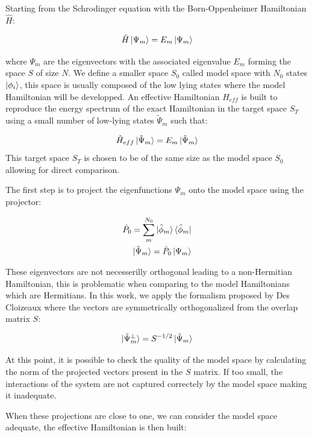 \documentclass[12pt]{report}
\numberwithin{equation}{section}
\begin{document}
Starting from the Schrodinger equation with the Born-Oppenheimer Hamiltonian $\hat{H}$:

\begin{equation}
    \hat{H}\ket{\Psi_m}=E_m\ket{\Psi_m}
\end{equation}

where $\Psi_m$ are the eigenvectors with the associated eigenvalue $E_m$ forming the space $S$ of size $N$. 
We define a smaller space $S_0$ called model space with $N_0$ states $\ket{\phi_i}$, this space is usually composed of the low lying states where the model Hamiltonian will be developped.
An effective Hamiltonian $H_{eff}$  is built to reproduce the energy spectrum of the exact Hamiltonian in the target space $S_T$ using a small number of low-lying states $\tilde{\Psi}_m$ such that:

\begin{equation}
    \hat{H}_{eff}\ket{\tilde{\Psi}_m}=E_m \ket{\tilde{\Psi}_m}
\end{equation}
This target space $S_T$ is chosen to be of the same size as the model space $S_0$ allowing for direct comparison.

The first step is to project the eigenfunctions $\Psi_m$ onto the model space using the projector:

\begin{align}
    \hat{P}_0=\sum_{m}^{N_0} \ket{\tilde{\phi}_m} \bra{\tilde{\phi}_m}\\
    \ket{\tilde{\Psi}_m}=\hat{P}_0 \ket{\Psi_m}
\end{align}

These eigenvectors are not necesserilly orthogonal leading to a non-Hermitian Hamiltonian, this is problematic when comparing to the model Hamiltonians which are Hermitians.
In this work, we apply the formalism proposed by Des Cloizeaux where the vectors are symmetrically orthogonalized from the overlap matrix $S$:

\begin{equation}
    \ket{\tilde{\Psi}_m^\bot}=S^{-1/2} \ket{\tilde{\Psi}_m}
\end{equation}

At this point, it is possible to check the quality of the model space by calculating the norm of the projected vectors present in the $S$ matrix.
If too small, the interactions of the system are not captured correctely by the model space making it inadequate. 
\par When these projections are close to one, we can consider the model space adequate, the effective Hamiltonian is then built:
\end{document}

